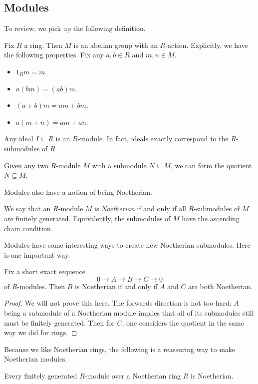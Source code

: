 \subsection{Modules}
To review, we pick up the following definition.
\begin{definition}[Module]
	Fix $R$ a ring. Then $M$ is an abelian group with an $R$-action. Explicitly, we have the following properties. Fix any $a,b\in R$ and $m,n\in M$.
	\begin{itemize}
		\item $1_Rm=m$.
		\item $a(bm)=(ab)m$.
		\item $(a+b)m=am+bm$.
		\item $a(m+n)=am+an$.
	\end{itemize}
\end{definition}
\begin{example}
	Any ideal $I\subseteq R$ is an $R$-module. In fact, ideals exactly correspond to the $R$-submodules of $R$.
\end{example}
\begin{example}
	Given any two $R$-module $M$ with a submodule $N\subseteq M$, we can form the quotient $N\subseteq M$.
\end{example}
Modules also have a notion of being Noetherian.
\begin{definition}
	We say that an $R$-module $M$ is \textit{Noetherian} if and only if all $R$-submodules of $M$ are finitely generated. Equivalently, the submodules of $M$ have the ascending chain condition.
\end{definition}
Modules have some interesting ways to create new Noetherian submodules. Here is one important way.
\begin{proposition}
	Fix a short exact sequence
	\[0\to A\to B\to C\to 0\]
	of $R$-modules. Then $B$ is Noetherian if and only if $A$ and $C$ are both Noetherian.
\end{proposition}
\begin{proof}
	We will not prove this here. The forwards direction is not too hard: $A$ being a submodule of a Noetherian module implies that all of its submodules still must be finitely generated. Then for $C$, one considers the quotient in the same way we did for rings.
\end{proof}
Because we like Noetherian rings, the following is a reassuring way to make Noetherian modules.
\begin{proposition}
	Every finitely generated $R$-module over a Noetherian ring $R$ is Noetherian.
\end{proposition}
